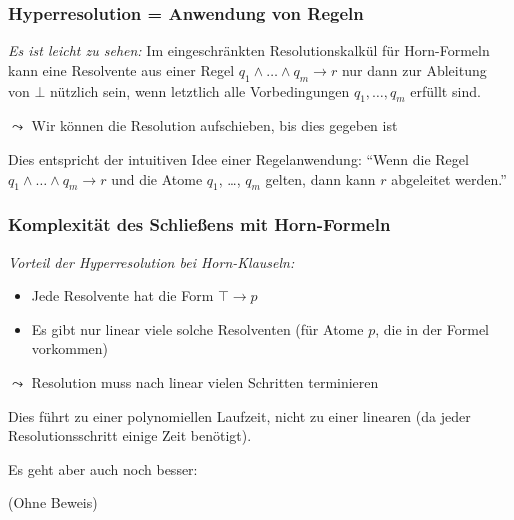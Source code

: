 \documentclass[aspectratio=1610,onlymath]{beamer}
\begin{document}
\begin{frame}\frametitle{Hyperresolution = Anwendung von Regeln}

\emph{Es ist leicht zu sehen:} Im eingeschränkten Resolutionskalkül für Horn-Formeln kann eine Resolvente aus einer Regel $q_1\wedge\ldots\wedge q_m\to r$
nur dann zur Ableitung von $\bot$ nützlich sein, wenn letztlich alle Vorbedingungen $q_1,\ldots, q_m$ erfüllt sind.

$\leadsto$ Wir können die Resolution aufschieben, bis dies gegeben ist
\bigskip\pause

%
Dies entspricht der intuitiven Idee einer \alert{Regelanwendung}: "`Wenn die Regel $q_1\wedge\ldots\wedge q_m\to r$ und die Atome $q_1$, \ldots, $q_m$ gelten, dann kann $r$ abgeleitet werden."'

\end{frame}

\begin{frame}\frametitle{Komplexität des Schließens mit Horn-Formeln}

\emph{Vorteil der Hyperresolution bei Horn-Klauseln:}
\begin{itemize}
\item Jede Resolvente hat die Form $\top\to p$
\item Es gibt nur linear viele solche Resolventen (für Atome $p$, die in der Formel vorkommen)
\end{itemize}
$\leadsto$ Resolution muss nach linear vielen Schritten terminieren
\pause\bigskip

Dies führt zu einer polynomiellen Laufzeit, nicht zu einer linearen (da jeder Resolutionsschritt einige Zeit benötigt).
\medskip

Es geht aber auch noch besser:


(Ohne Beweis)


\end{frame}
\end{document}
